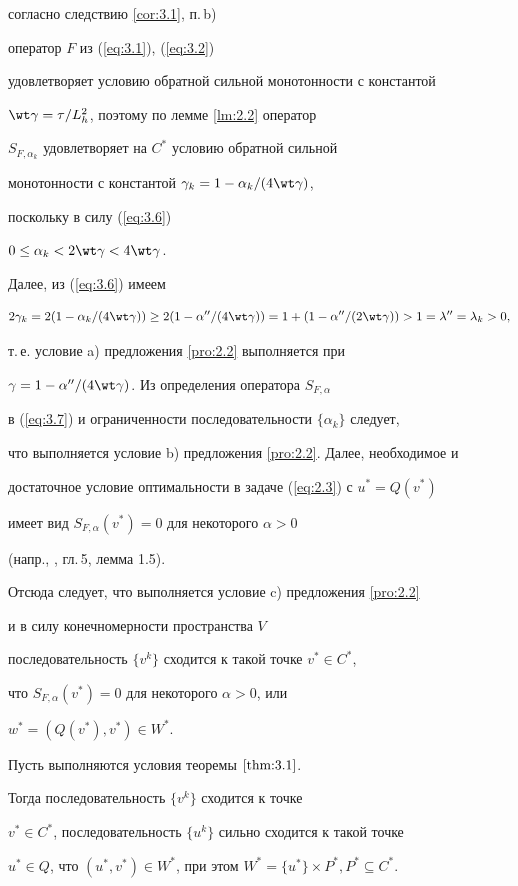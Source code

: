 \begin{pf}
согласно следствию \ref{cor:3.1}, п.\,b)


оператор $F$ из (\ref{eq:3.1}), (\ref{eq:3.2}) 


удовлетворяет условию обратной сильной монотонности с константой 


$\wt \gamma=\tau / L^2_{h}$, поэтому по лемме \ref{lm:2.2} оператор


$S_{F, \alpha_{k}}$ удовлетворяет на $C^*$ условию обратной сильной 


монотонности с константой $\gamma_{k}=1 - \alpha_{k} / (4 \wt \gamma)$, 


поскольку в силу (\ref{eq:3.6})


$0 \leq \alpha_{k} < 2 \wt \gamma < 4 \wt \gamma$.


Далее, из (\ref{eq:3.6}) имеем


$$ 


2\gamma_{k}=2(1-\alpha_{k}/(4\wt \gamma))\geq 2(1-\alpha''/(4\wt \gamma))=


1+(1 - \alpha'' / (2 \wt \gamma )) > 1=\lambda''=\lambda_{k} > 0,


$$


т.\,е. условие a) предложения \ref{pro:2.2} выполняется при 


$\gamma=1-\alpha''/(4\wt\gamma)$. Из определения оператора $S_{F, \alpha}$ 


в (\ref{eq:3.7}) и ограниченности последовательности $\{\alpha_k\}$ следует, 


что выполняется условие b) предложения \ref{pro:2.2}. Далее, необходимое и


достаточное условие оптимальности в задаче (\ref{eq:2.3}) с $u^*=Q(v^*)$ 


имеет вид $S_{F, \alpha} (v^*)=0$ для некоторого $\alpha > 0$ 


(напр., \cite{GT89}, гл.\,5, лемма 1.5).


Отсюда следует, что выполняется условие c) предложения \ref{pro:2.2} 


и в силу конечномерности пространства $V$


последовательность $ \{v^{k} \} $ сходится к такой точке $v^* \in C^*$,


что $S_{F, \alpha} (v^*)=0$ для некоторого $\alpha > 0$, или 


$w^*=(Q(v^*), v^*) \in W^*$.


\end{pf}





\begin{thm} \label{thm:3.2}


Пусть выполняются условия теоремы $\ref{thm:3.1}$. 


Тогда последовательность $\{v^{k} \}$ сходится к точке 


$v^* \in C^*$, последовательность $\{u^{k} \}$ сильно сходится к такой точке 


$u^* \in Q$, что $(u^*, v^*) \in W^*$, при этом $ W^*=\{u^*\} \times P^*, 


P^* \subseteq C^*$.


\end{thm}





